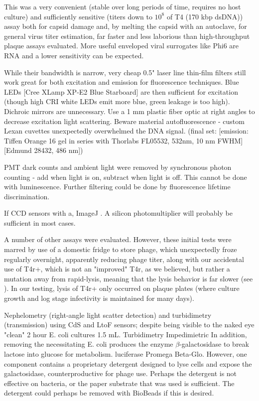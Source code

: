 \documentclass[paper.tex]{subfiles}
\begin{document}
This was a very convenient (stable over long periods of time, requires no host culture) and sufficiently sensitive (titers down to $10^8$ of T4 (170 kbp dsDNA)) assay both for capsid damage and, by melting the capsid with an autoclave, for general virus titer estimation, far faster and less laborious than high-throughput plaque assays evaluated\cite{Simple2018}\cite{Streamlining2018}. More useful enveloped viral surrogates like Phi6 are RNA and a lower sensitivity can be expected.\cite{Selected}

While their bandwidth is narrow, very cheap 0.5" laser line thin-film filters still work great for both excitation and emission for fluorescence techniques. Blue LEDs [Cree XLamp XP-E2 Blue Starboard] are then sufficient for excitation (though high CRI white LEDs emit more blue, green leakage is too high). Dichroic mirrors are unnecessary. Use a 1 mm plastic fiber optic at right angles to decrease excitation light scattering. Beware material autofluorescence - custom Lexan cuvettes unexpectedly overwhelmed the DNA signal. (final set: [emission: Tiffen Orange 16 gel in series with Thorlabs FL05532, 532nm, 10 nm FWHM] [Edmund 28432, 486 nm])

PMT dark counts and ambient light were removed by synchronous photon counting - add when light is on, subtract when light is off.  This cannot be done with luminescence. Further filtering could be done by fluorescence lifetime discrimination. 

If CCD sensors with a, ImageJ \cite{Image2012}. A silicon photomultiplier will probably be sufficient in most cases.

A number of other assays were evaluated. However, these initial tests were marred by use of a domestic fridge to store phage, which unexpectedly froze regularly overnight, apparently reducing phage titer, along with our accidental use of T4r+, which is not an "improved" T4r, as we believed, but rather a mutation away from rapid-lysis, meaning that the lysis behavior is far slower (see \cite{Spontaneous1946}). In our testing, lysis of T4r+ only occurred on plaque plates (where culture growth and log stage infectivity is maintained for many days). 

Nephelometry (right-angle light scatter detection) and turbidimetry (transmission) using CdS and LtoF sensors; despite being visible to the naked eye "clean" 2 hour E. coli cultures 1.5 mL. Turbidimetry Impedimietric In addition, removing the necessitating 
E. coli produces the enzyme $\beta$-galactosidase to break lactose into glucose for metabolism. luciferase Promega Beta-Glo\cite{rapid2014}. However, one component contains a proprietary detergent designed to lyse cells and expose the galactosidase, counterproductive for phage use. Perhaps the detergent is not effective on bacteria, or the paper substrate that was used is sufficient. The detergent could perhaps be removed with BioBeads if this is desired.
 
\end{document}
